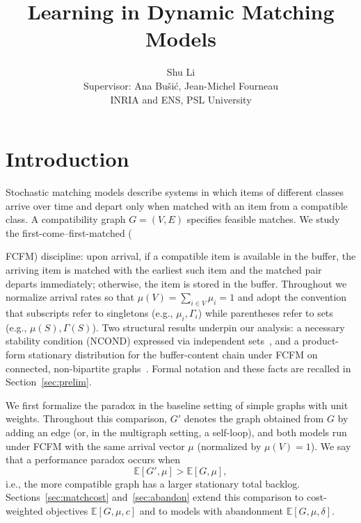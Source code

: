 \documentclass[11pt]{article}
\title{Learning in Dynamic Matching Models}
\author{Shu Li \\
        Supervisor:  Ana Bu\v{s}i\'{c}, Jean-Michel Fourneau\\
        INRIA and ENS, PSL University}
\date{}
\begin{document}
\maketitle
\section{Introduction}\label{sec:intro}

Stochastic matching models describe systems in which items of different classes arrive over time and depart only when matched with an item from a compatible class. A compatibility graph $G=(V,E)$ specifies feasible matches. We study the first-come--first-matched ({\textsc{FCFM}) discipline: upon arrival, if a compatible item is available in the buffer, the arriving item is matched with the earliest such item and the matched pair departs immediately; otherwise, the item is stored in the buffer. Throughout we normalize arrival rates so that $\mu(V)=\sum_{i\in V}\mu_i=1$ and adopt the convention that subscripts refer to singletons (e.g., $\mu_i,\Gamma_i$) while parentheses refer to sets (e.g., $\mu(S),\Gamma(S)$). Two structural results underpin our analysis: a necessary stability condition (\textsc{NCOND}) expressed via independent sets~\cite{MaMo18}, and a product-form stationary distribution for the buffer-content chain under \textsc{FCFM} on connected, non-bipartite graphs~\cite{MBMa21}. Formal notation and these facts are recalled in Section~\ref{sec:prelim}.

We first formalize the paradox in the baseline setting of simple graphs with unit weights.
Throughout this comparison, $G'$ denotes the graph obtained from $G$ by adding an edge (or, in the multigraph setting, a self-loop), and both models run under FCFM with the same arrival vector $\mu$ (normalized by $\mu(V)=1$).
We say that a performance paradox occurs when
\[
\mathbb{E}[G',\mu]>\mathbb{E}[G,\mu],
\]
i.e., the more compatible graph has a larger stationary total backlog. Sections~\ref{sec:matchcost} and~\ref{sec:abandon} extend this comparison to cost-weighted objectives $\mathbb{E}[G,\mu,c]$ and to models with abandonment $\mathbb{E}[G,\mu,\delta]$.

}
\end{document}

